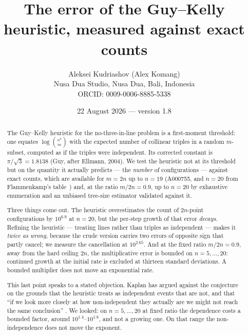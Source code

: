 \documentclass[11pt,a4paper]{article}
\title{The error of the Guy--Kelly heuristic, measured against exact counts}
\author{Aleksei Kudriashov (Alex Komang)\\ \small Nusa Dua Studio, Nusa Dua, Bali, Indonesia\\ \small ORCID: 0009-0006-8885-5338}
\date{22 August 2026 --- version 1.8}
\begin{document}
\maketitle
\begin{abstract}
The Guy--Kelly heuristic for the no-three-in-line problem is a first-moment threshold: one equates
$\log\binom{n^2}{m}$ with the expected number of collinear triples in a random $m$-subset, computed
as if the triples were independent.  Its corrected constant is $\pi/\sqrt3=1.8138$ (Guy, after
Ellmann, 2004).  We test the heuristic not at its threshold but on the quantity it actually
predicts --- the \emph{number} of configurations --- against exact counts, which are available for
$m=2n$ up to $n=19$ (A000755, and $n=20$ from Flammenkamp's table~\cite{Flammenkamp}) and, at the ratio $m/2n=0.9$, up to $n=20$ by exhaustive enumeration and an
unbiased tree-size estimator validated against it.

Three things come out.  The heuristic overestimates the count of $2n$-point configurations by
$10^{6.9}$ at $n=20$, but the per-step growth of that error \emph{decays}.  Refining the heuristic
--- treating lines rather than triples as independent --- makes it \emph{twice as wrong}, because
the crude version carries two errors of opposite sign that partly cancel; we measure the
cancellation at $10^{2.65}$.  And at the fixed ratio $m/2n=0.9$, away from the hard ceiling $2n$,
the multiplicative error is bounded on $n=5,\dots,20$: continued growth at the initial rate is
excluded at thirteen standard deviations.  A bounded multiplier does not move an exponential rate.

This last point speaks to a stated objection.  Kaplan has argued against the conjecture on the
grounds that the heuristic treats as independent events that are not, and that ``if we look more
closely at how non-independent they actually are we might not reach the same conclusion''
\cite{Kaplan}.  We looked: on $n=5,\dots,20$ at fixed ratio the dependence costs a bounded factor,
around $10^{1.4}$--$10^{1.8}$, and not a growing one.  On that range the non-independence does not
move the exponent.
\end{abstract}
\end{document}

